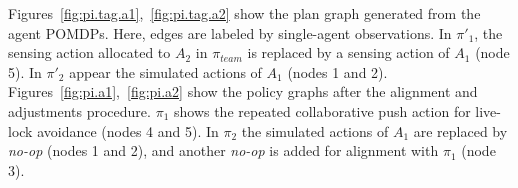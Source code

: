 \documentclass[runningheads]{llncs}
\newcommand{\commentout}[1]{}
\newcommand{\eliran}[1]{\textbf{[\color{red}ELIRAN:#1]}}
\newcommand{\ronen}[1]{\textbf{[\color{blue}RONEN:#1]}}
\begin{document}



\begin{example}
Figures~\ref{fig:pi.tag.a1},~\ref{fig:pi.tag.a2} show the plan graph generated from the agent POMDPs. Here, edges are labeled by single-agent observations.
In $\pi'_1$, the sensing action allocated to $A_2$ in $\pi_{team}$ is replaced by a sensing action of $A_1$ (node 5).
In $\pi'_2$ appear the simulated actions of $A_1$ (nodes 1 and 2).
Figures~\ref{fig:pi.a1},~\ref{fig:pi.a2}
show the policy graphs after the alignment and adjustments procedure.
$\pi_1$ shows the repeated collaborative push action for live-lock avoidance (nodes 4 and 5). In $\pi_2$ the simulated actions of $A_1$ are replaced by {\em no-op} (nodes 1 and 2), and another {\em no-op} is added for alignment with $\pi_1$ (node 3).



\end{example}
\end{document}
